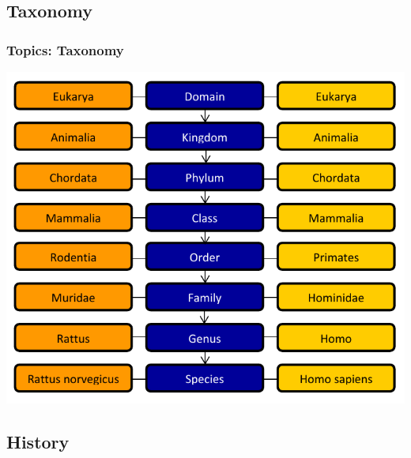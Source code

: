 \documentclass{beamer}
\begin{document}
\subsection[Taxonomy]{Taxonomy}

\begin{frame}
\frametitle{Topics: Taxonomy}
\begin{center}
\includegraphics[width=.7\textwidth]{TaxonomyChart}
\end{center}
\end{frame}

\subsection[History]{History}
\end{document}
